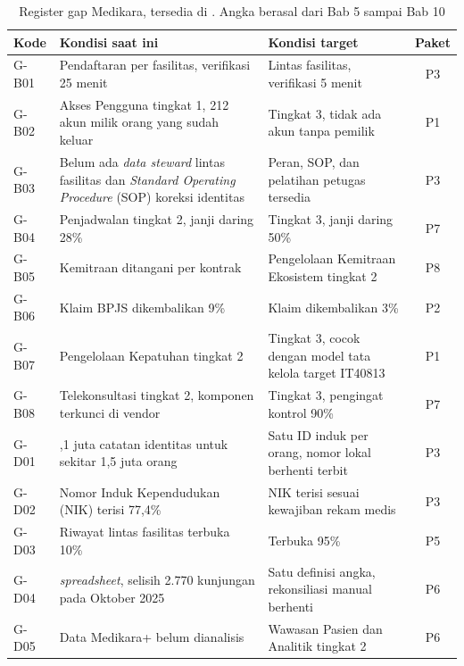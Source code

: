 \begin{table}[!htb]
  \centering
  \caption{Register gap Medikara, tersedia di .
           Angka berasal dari Bab 5 sampai Bab 10}
  \label{tab:ch11-register-gap}
  \scriptsize
  \begin{tabularx}{\textwidth}{l>{\raggedright\arraybackslash}X>{\raggedright\arraybackslash}Xc}
    \hline
    \textbf{Kode} & \textbf{Kondisi saat ini} & \textbf{Kondisi target} & \textbf{Paket} \\ \hline
    G-B01 & Pendaftaran per fasilitas, verifikasi 25 menit & Lintas fasilitas, verifikasi 5 menit & P3 \\ \hline
    G-B02 & Akses Pengguna tingkat 1, 212 akun milik orang yang sudah keluar & Tingkat 3, tidak ada akun tanpa pemilik & P1 \\ \hline
    G-B03 & Belum ada \textit{data steward} lintas fasilitas dan \textit{Standard Operating Procedure} (SOP) koreksi identitas & Peran, SOP, dan pelatihan petugas tersedia & P3 \\ \hline
    G-B04 & Penjadwalan tingkat 2, janji daring 28\% & Tingkat 3, janji daring 50\% & P7 \\ \hline
    G-B05 & Kemitraan ditangani per kontrak & Pengelolaan Kemitraan Ekosistem tingkat 2 & P8 \\ \hline
    G-B06 & Klaim BPJS dikembalikan 9\% & Klaim dikembalikan 3\% & P2 \\ \hline
    G-B07 & Pengelolaan Kepatuhan tingkat 2 & Tingkat 3, cocok dengan model tata kelola target IT40813 & P1 \\ \hline
    G-B08 & Telekonsultasi tingkat 2, komponen terkunci di vendor & Tingkat 3, pengingat kontrol 90\% & P7 \\ \hline
    G-D01 & 2,1 juta catatan identitas untuk sekitar 1,5 juta orang & Satu ID induk per orang, nomor lokal berhenti terbit & P3 \\ \hline
    G-D02 & Nomor Induk Kependudukan (NIK) terisi 77,4\% & NIK terisi sesuai kewajiban rekam medis & P3 \\ \hline
    G-D03 & Riwayat lintas fasilitas terbuka 10\% & Terbuka 95\% & P5 \\ \hline
    G-D04 & 23 \textit{spreadsheet}, selisih 2.770 kunjungan pada Oktober 2025 & Satu definisi angka, rekonsiliasi manual berhenti & P6 \\ \hline
    G-D05 & Data Medikara+ belum dianalisis & Wawasan Pasien dan Analitik tingkat 2 & P6 \\ \hline

\end{tabularx}
\end{table}
